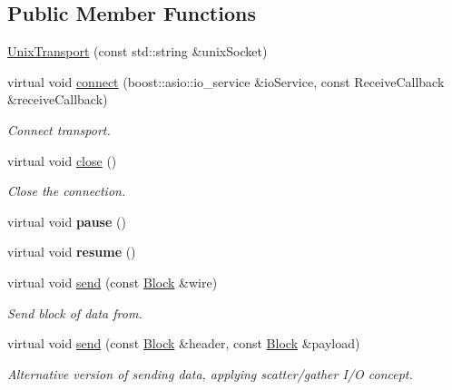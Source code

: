 \subsection*{Public Member Functions}
\begin{DoxyCompactItemize}
\item 
\hyperlink{classndn_1_1UnixTransport_aa8eae0b0a4481ff4a81b20bae1dfb851}{Unix\+Transport} (const std\+::string \&unix\+Socket)
\item 
virtual void \hyperlink{classndn_1_1UnixTransport_acc1c4c6db549a02de32873e2f6d028ba}{connect} (boost\+::asio\+::io\+\_\+service \&io\+Service, const Receive\+Callback \&receive\+Callback)
\begin{DoxyCompactList}\small\item\em Connect transport. \end{DoxyCompactList}\item 
virtual void \hyperlink{classndn_1_1UnixTransport_a2843582a2b904b19d53d17cba0ea5088}{close} ()\hypertarget{classndn_1_1UnixTransport_a2843582a2b904b19d53d17cba0ea5088}{}\label{classndn_1_1UnixTransport_a2843582a2b904b19d53d17cba0ea5088}

\begin{DoxyCompactList}\small\item\em Close the connection. \end{DoxyCompactList}\item 
virtual void {\bfseries pause} ()\hypertarget{classndn_1_1UnixTransport_a8d9a964975c43b493204a7e5e44ed83c}{}\label{classndn_1_1UnixTransport_a8d9a964975c43b493204a7e5e44ed83c}

\item 
virtual void {\bfseries resume} ()\hypertarget{classndn_1_1UnixTransport_aa2336fb5302a7194c2e3dc7b4da9024a}{}\label{classndn_1_1UnixTransport_aa2336fb5302a7194c2e3dc7b4da9024a}

\item 
virtual void \hyperlink{classndn_1_1UnixTransport_adabc1cec2e4869fbf2ae339f3d86300b}{send} (const \hyperlink{classndn_1_1Block}{Block} \&wire)
\begin{DoxyCompactList}\small\item\em Send block of data from. \end{DoxyCompactList}\item 
virtual void \hyperlink{classndn_1_1UnixTransport_ad77f8d8adf009f79f1d8a92a217b413b}{send} (const \hyperlink{classndn_1_1Block}{Block} \&header, const \hyperlink{classndn_1_1Block}{Block} \&payload)
\begin{DoxyCompactList}\small\item\em Alternative version of sending data, applying scatter/gather I/O concept. \end{DoxyCompactList}\end{DoxyCompactItemize}
